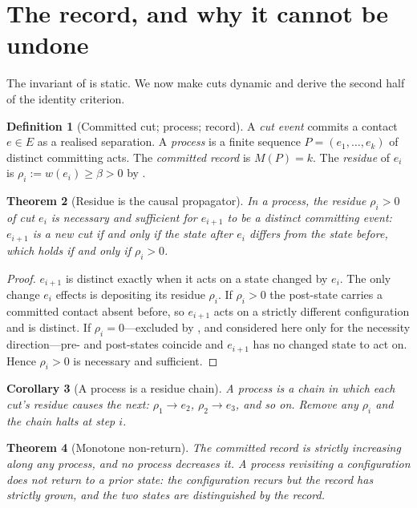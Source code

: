 \documentclass[11pt,twocolumn,a4paper]{article}
\theoremstyle{dirthm}
\newtheorem{theorem}{Theorem}[section]
\newtheorem{corollary}[theorem]{Corollary}
\theoremstyle{definition}
\newtheorem{definition}[theorem]{Definition}
\theoremstyle{remark}
\newcommand{\E}{E}
\newcommand{\wt}{w}
\newcommand{\flo}{\beta}
\newcommand{\res}{\rho}
\newcommand{\rec}{M}
\begin{document}
\section{The record, and why it cannot be undone}
\label{sec:record}

The invariant of  is static. We now make cuts dynamic and
derive the second half of the identity criterion.

\begin{definition}[Committed cut; process; record]
\label{def:committed}
A \emph{cut event} commits a contact $e\in\E$ as a realised separation. A
\emph{process} is a finite sequence $P=(e_1,\dots,e_k)$ of distinct
committing acts. The \emph{committed record} is $\rec(P)=k$. The
\emph{residue} of $e_i$ is $\res_i:=\wt(e_i)\ge\flo>0$ by .
\end{definition}

\begin{theorem}[Residue is the causal propagator]
\label{thm:propagator}
In a process, the residue $\res_i>0$ of cut $e_i$ is necessary and sufficient
for $e_{i+1}$ to be a distinct committing event: $e_{i+1}$ is a new cut if and
only if the state after $e_i$ differs from the state before, which holds if
and only if $\res_i>0$.
\end{theorem}

\begin{proof}
$e_{i+1}$ is distinct exactly when it acts on a state changed by $e_i$. The
only change $e_i$ effects is depositing its residue $\res_i$. If $\res_i>0$
the post-state carries a committed contact absent before, so $e_{i+1}$ acts on
a strictly different configuration and is distinct. If $\res_i=0$---excluded
by , and considered here only for the necessity
direction---pre- and post-states coincide and $e_{i+1}$ has no changed state
to act on. Hence $\res_i>0$ is necessary and sufficient.
\end{proof}

\begin{corollary}[A process is a residue chain]
\label{cor:chain}
A process is a chain in which each cut's residue causes the next:
$\res_1\to e_2$, $\res_2\to e_3$, and so on. Remove any $\res_i$ and the chain
halts at step $i$.
\end{corollary}

\begin{theorem}[Monotone non-return]
\label{thm:monotone}
The committed record is strictly increasing along any process, and no process
decreases it. A process revisiting a configuration does not return to a prior
state: the configuration recurs but the record has strictly grown, and the
two states are distinguished by the record.
\end{theorem}
\end{document}
